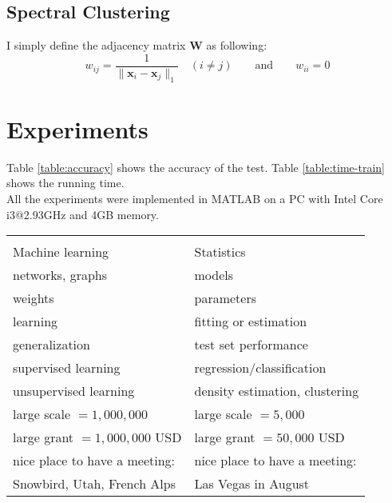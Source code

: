\documentclass[8pt]{article}
\begin{document}
\subsection{Spectral Clustering}
I simply define the adjacency matrix $\bm{W}$ as following:
$$w_{ij} = \frac{1}{\|\bm{x}_i-\bm{x}_j\|_1} \quad (i\ne j) \qquad \text{and}
\qquad w_{ii} = 0$$


\section{Experiments}
Table \ref{table:accuracy} shows the accuracy of the test.
Table \ref{table:time-train} shows the running time.\\
All the experiments were implemented in MATLAB on a PC
with Intel Core i3@2.93GHz and 4GB memory.
\begin{table}[t]
\begin{center}
\begin{tabular}{|l|l|}
\hline \hline \\
Machine learning & Statistics \\ \hline
networks, graphs &  models
\\ \hline
weights &  parameters \\  \hline
learning &  fitting or
estimation
\\ \hline
generalization & test set performance \\ \hline supervised learning
& regression/classification \\ \hline unsupervised learning &
density estimation, clustering \\ \hline
large scale $=1,000,000$ &
large scale $= 5,000$ \\ \hline
large grant $= 1,000,000$ USD &
large grant $= 50,000$ USD \\  \hline
nice place to have a meeting: & nice place to have a meeting: \\
Snowbird, Utah, French Alps & Las Vegas in August \\ \hline
\end{tabular}
\end{center}
\begin{table}


\end{table}
\end{table}
\end{document}
